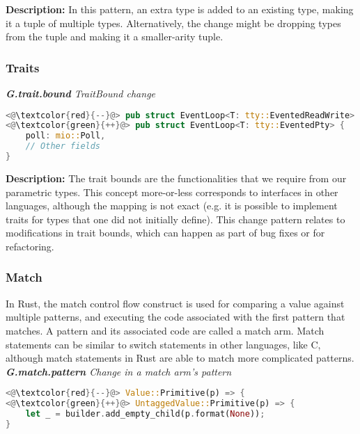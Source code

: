 \noindent\textbf{Description:} In this pattern, an extra type is added to an existing type, making it a tuple of multiple types. Alternatively, the change might be dropping types from the tuple and making it a smaller-arity tuple.

\subsubsection{Traits}
\noindent\textit{\textbf{G.trait.bound} TraitBound change}

\begin{lstlisting}[language=Rust, style=colouredRust]
<@\textcolor{red}{--}@> pub struct EventLoop<T: tty::EventedReadWrite> {
<@\textcolor{green}{++}@> pub struct EventLoop<T: tty::EventedPty> {
    poll: mio::Poll,
    // Other fields
}

\end{lstlisting}

\noindent\textbf{Description:} The trait bounds are the functionalities that we require from our parametric types. This concept more-or-less corresponds to interfaces in other languages, although the mapping is not exact (e.g. it is possible to implement traits for types that one did not initially define). This change pattern relates to modifications in trait bounds, which can happen as part of bug fixes or for refactoring. \\

\subsubsection{Match}

In Rust, the match control flow construct is used for comparing a value against multiple patterns, and executing the code associated with the first pattern that matches. A pattern and its associated code are called a match arm. Match statements can be similar to switch statements in other languages, like C, although match statements in Rust are able to match more complicated patterns.\\

\noindent\textit{\textbf{G.match.pattern} Change in a match arm's pattern}

\begin{lstlisting}[language=Rust, style=colouredRust]
<@\textcolor{red}{--}@> Value::Primitive(p) => {
<@\textcolor{green}{++}@> UntaggedValue::Primitive(p) => {
    let _ = builder.add_empty_child(p.format(None));
}
\end{lstlisting}

